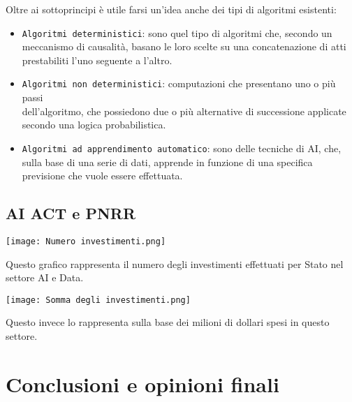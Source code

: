 \documentclass{article}
\begin{document}
\begin{justify}
\begin{itemize}
    \end{itemize}
    Oltre ai sottoprincipi è utile farsi un'idea anche dei tipi di algoritmi esistenti:
    \begin{itemize}
        \item \texttt{Algoritmi deterministici}: sono quel tipo di algoritmi che, secondo un meccanismo di causalità, basano le loro scelte su una concatenazione di atti prestabiliti l'uno seguente a l'altro.
        \item \texttt{Algoritmi non deterministici}: computazioni che presentano uno o più passi\\ dell'algoritmo, che possiedono due o più alternative di successione applicate secondo una logica probabilistica.
        \item \texttt{Algoritmi ad apprendimento automatico}: sono delle tecniche di AI, che, sulla base di una serie di dati, apprende in funzione di una specifica previsione che vuole essere effettuata.
    \end{itemize}
\end{justify}

\newpage\subsection{AI ACT e PNRR}
\begin{center}
    \texttt{[image: Numero investimenti.png]}
\end{center}
\begin{justify}
    Questo grafico rappresenta il numero degli investimenti effettuati per Stato nel settore AI e Data.
\end{justify}

\begin{center}
    \texttt{[image: Somma degli investimenti.png]}
\end{center}
\begin{justify}
    Questo invece lo rappresenta sulla base dei milioni di dollari spesi in questo settore.
\end{justify}

\newpage \centering
\section{Conclusioni e opinioni finali}
\begin{justify}
   
\end{justify}

\begin{justify}
    
    
\end{justify}
\end{document}
